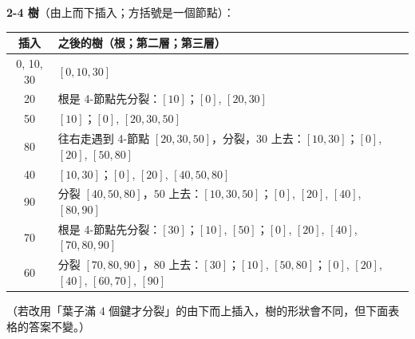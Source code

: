 \begin{pastsoln}
\textbf{2-4 樹}（由上而下插入；方括號是一個節點）：
\begin{center}
\small
\begin{tabular}{cl}
\toprule
插入 & 之後的樹（根；第二層；第三層） \\
\midrule
0, 10, 30 & $[0, 10, 30]$ \\
20 & 根是 4-節點先分裂：$[10]$；$[0]$, $[20, 30]$ \\
50 & $[10]$；$[0]$, $[20, 30, 50]$ \\
80 & 往右走遇到 4-節點 $[20,30,50]$，分裂，$30$ 上去：$[10, 30]$；$[0]$, $[20]$, $[50, 80]$ \\
40 & $[10, 30]$；$[0]$, $[20]$, $[40, 50, 80]$ \\
90 & 分裂 $[40,50,80]$，$50$ 上去：$[10, 30, 50]$；$[0]$, $[20]$, $[40]$, $[80, 90]$ \\
70 & 根是 4-節點先分裂：$[30]$；$[10]$, $[50]$；$[0]$, $[20]$, $[40]$, $[70, 80, 90]$ \\
60 & 分裂 $[70,80,90]$，$80$ 上去：$[30]$；$[10]$, $[50, 80]$；$[0]$, $[20]$, $[40]$, $[60, 70]$, $[90]$ \\
\bottomrule
\end{tabular}
\end{center}
（若改用「葉子滿 4 個鍵才分裂」的由下而上插入，樹的形狀會不同，但下面表格的答案不變。）


\end{pastsoln}
